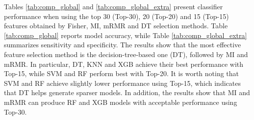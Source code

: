 \documentclass[lettersize,journal]{IEEEtran}
\begin{document}
Tables \ref{tab:comp_global} and \ref{tab:comp_global_extra} present classifier performance when using the top 30 (Top-30), 20 (Top-20) and 15 (Top-15) features obtained by Fisher, MI, mRMR and DT selection methods. Table \ref{tab:comp_global} reports model accuracy, while Table \ref{tab:comp_global_extra} summarizes sensitivity and specificity. The results show that the most effective feature selection method is the decision-tree-based one (DT), followed by MI and mRMR. In particular, DT, KNN and XGB achieve their best performance with Top-15, while SVM and RF perform best with Top-20. It is worth noting that SVM and RF achieve slightly lower performance using Top-15, which indicates that DT helps generate sparser models. In addition, the results show that MI and mRMR can produce RF and XGB models with acceptable performance using Top-30.
\FloatBarrier

\begin{table}[!htbp]
	\centering
	\caption{Accuracy attained by models using the top 15 (Top-15), 20 (Top-20) and 30 (Top-30) features selected by Fisher, MI, mRMR and DT.}
	\label{tab:comp_global}
	\scriptsize
	\setlength{\tabcolsep}{1.5pt}
	\renewcommand{\arraystretch}{1}
\end{table}
\end{document}
